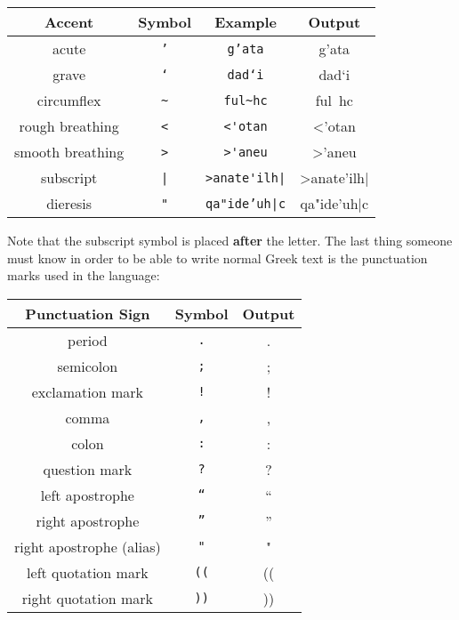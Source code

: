 \documentclass[11pt]{article}
\newcommand{\langGreek}{\foreignlanguage{greek}}
\newcommand{\sg}{\selectlanguage{greek}}
\newcommand{\sa}{\selectlanguage{american}}
\begin{document}
\begin{center}
\begin{tabular}{cccc}\hline
Accent & Symbol & Example & Output\\ \hline
acute  & \texttt{'} & \texttt{g'ata} & \langGreek{g'ata}\\
grave  & \texttt{`} & \texttt{dad`i} & \langGreek{dad`i}\\
circumflex & \verb+~+ & \verb+ful~hc+ & \sg\langGreek{ful~hc}\sa\\
rough breathing & \verb+<+ & \verb+<'otan+ & \sg\langGreek{<'otan}\sa\\
smooth breathing & \verb+>+ & \verb+>'aneu+ & \sg\langGreek{>'aneu}\sa\\
subscript & \texttt{|} & \verb+>anate'ilh|+ & \sg\langGreek{>anate'ilh|}\\
dieresis & \texttt{"}& \texttt{qa"ide'uh|c} & \sg\langGreek{qa"ide'uh|c}\\
\hline
\end{tabular}
\end{center}
Note that the subscript symbol is placed \textbf{after} the letter.
The last thing someone must know in order to be able to write normal Greek
text is the punctuation marks used in the language:
\begin{center}
\begin{tabular}{ccc}\hline
Punctuation Sign & Symbol & Output\\ \hline
period   & \texttt{.} & \sg\langGreek{.}\sa\\
semicolon & \texttt{;} & \sg\langGreek{;}\sa\\
exclamation mark & \texttt{!} & \sg\langGreek{!}\sa\\
comma & \texttt{,} & \sg\langGreek{,}\sa\\
colon & \texttt{:} & \sg\langGreek{:}\sa\\
question mark & \texttt{?} & \sg\langGreek{?}\sa\\
left apostrophe & \texttt{``} & \sg\langGreek{``}\sa\\
right apostrophe & \texttt{''} & \sg\langGreek{''}\sa\\
right apostrophe (alias) & \texttt{"} & \sg\langGreek{"}\sa\\
left quotation mark & \texttt{((} & \sg\langGreek{((}\sa\\
right quotation mark & \texttt{))} & \sg\langGreek{))}\sa\\ \hline
\end{tabular}
\end{center}
\end{document}
